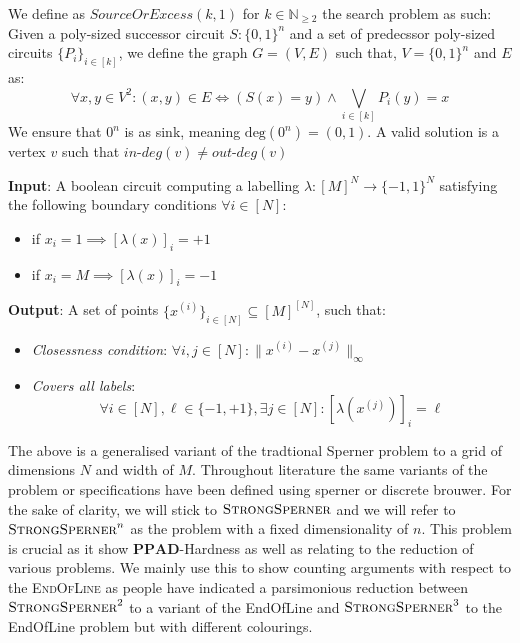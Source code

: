 \begin{definition}
    We define as $\textit{SourceOrExcess}(k,1)$ for $k \in \mathbb{N}_{\geq 2}$
    the search problem as such: Given a poly-sized successor circuit $S : \{0,1\}^n$
    and a set of predecssor poly-sized circuits $\{P_i\}_{i \in [k]}$, we define
    the graph $G = (V,E)$ such that, $V = \{0,1\}^n$ and $E$ as:
    $$
    \forall x, y \in V^2: (x,y) \in E \iff (S(x) = y) \wedge \bigvee_{i \in [k]} P_i(y) = x
    $$
    We ensure that $0^n$ is as sink, meaning $\text{deg}(0^n) = (0,1)$.
    A valid solution is a vertex $v$ such that $\textit{in-deg}(v) \neq \textit{out-deg}(v)$
\end{definition}



\begin{definition}
    \textbf{Input}: A boolean circuit computing a labelling $\lambda: [M]^N \to \{-1, 1\}^N$
    satisfying the following boundary conditions $\forall i \in [N]$:
    \begin{itemize}
        \item if $x_i = 1 \implies [\lambda(x)]_i = +1$
        \item if $x_i = M \implies [\lambda(x)]_i = -1$
    \end{itemize}
    \textbf{Output}: A set of points $\{x^{(i)}\}_{i \in [N]} \subseteq [M]^{[N]}$, such that:
    \begin{itemize}
        \item \textit{Closessness condition}: $\forall i,j \in [N]: \|x^{(i)} - x^{(j)}\|_{\infty}$
        \item \textit{Covers all labels}:
            $$
            \forall i \in [N], \ell \in \{-1, +1\}, \exists j \in [N]: [\lambda(x^{(j)})]_{i} = \ell
            $$
    \end{itemize}
\end{definition}


The above is a generalised variant of the tradtional Sperner problem to
a grid of dimensions $N$ and width of $M$. 
Throughout literature the same variants of the problem or specifications
have been defined using sperner or discrete brouwer. For the sake 
of clarity, we will stick to $\textsc{StrongSperner}$ and
we will refer to $\textsc{StrongSperner}^n$ as the problem
with a fixed dimensionality of $n$. This problem
is crucial as it show $\textbf{PPAD}$-Hardness as well as
relating to the reduction of various problems.
We mainly use this to show counting arguments with respect to the
\textsc{EndOfLine} as people have indicated a parsimonious reduction
between $\textsc{StrongSperner}^2$ to a variant of the EndOfLine
and $\textsc{StrongSperner}^3$ to the EndOfLine problem but with
different colourings.

